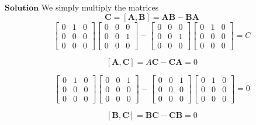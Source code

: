 \documentclass{article}
\begin{document}
\begin{flushleft}
$\boxed{\textbf{Solution}}$ We simply multiply the matrices
$$\mathbf{C}=[\mathbf{A}, \mathbf{B}] = \mathbf{\mathbf{AB}}- \mathbf{BA}$$
$$\begin{bmatrix}{0} & {1} & {0} \\ {0} & {0} & {0} \\ {0} & {0} & {0}\end{bmatrix} \begin{bmatrix}{0} & {0} & {0} \\ {0} & {0} & {1} \\ {0} & {0} & {0}\end{bmatrix} - \begin{bmatrix}{0} & {0} & {0} \\ {0} & {0} & {1} \\ {0} & {0} & {0}\end{bmatrix}\begin{bmatrix}{0} & {1} & {0} \\ {0} & {0} & {0} \\ {0} & {0} & {0}\end{bmatrix} = C$$

$$[\mathbf{A}, \mathbf{C}] = A\mathbf{C}-\mathbf{C}\mathbf{A} = 0$$

$$\begin{bmatrix}{0} & {1} & {0} \\ {0} & {0} & {0} \\ {0} & {0} & {0}\end{bmatrix} \begin{bmatrix}{0} & {0} & {1} \\ {0} & {0} & {0} \\ {0} & {0} & {0}\end{bmatrix}- \begin{bmatrix}{0} & {0} & {1} \\ {0} & {0} & {0} \\ {0} & {0} & {0}\end{bmatrix}\begin{bmatrix}{0} & {1} & {0} \\ {0} & {0} & {0} \\ {0} & {0} & {0}\end{bmatrix} = 0$$

$$[\mathbf{B}, \mathbf{C}] = \mathbf{BC}-\mathbf{C}\mathbf{B} = 0$$


\end{flushleft}
\end{document}
